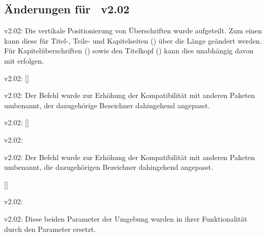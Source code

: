 %
\subsection{Änderungen für \TUDScript~v2.02}
\begin{Obsolete}{v2.02:}{}
\printobsoletelist%
%
Die vertikale Positionierung von Überschriften wurde aufgeteilt. Zum einen kann 
diese für Titel-, Teile- und Kapitelseiten () über 
die Länge  geändert werden. Für Kapitelüberschriften 
() sowie den Titelkopf () 
kann dies unabhängig davon mit  erfolgen.
\end{Obsolete}

\begin{Obsolete}{v2.02:}{%
  []%
}
\begin{Obsolete}{v2.02:}{}
\printobsoletelist%
%
Der Befehl wurde zur Erhöhung der Kompatibilität mit anderen Paketen umbenannt, 
der dazugehörige Bezeichner dahingehend angepasst.
\end{Obsolete}
\end{Obsolete}

\begin{Obsolete}{v2.02:}{%
  []%
}
\begin{Obsolete}{v2.02:}{}
\begin{Obsolete}{v2.02:}{}
\printobsoletelist%
%
Der Befehl wurde zur Erhöhung der Kompatibilität mit anderen Paketen umbenannt, 
die dazugehörigen Bezeichner dahingehend angepasst.
\end{Obsolete}
\end{Obsolete}
\end{Obsolete}

\begin{Obsolete}{}{[]}
\begin{Obsolete}{v2.02:}{%
}
\begin{Obsolete}{v2.02:}{%
}
\printobsoletelist%
%
Diese beiden Parameter der Umgebung  wurden in ihrer 
Funktionalität durch den Parameter  
ersetzt.
\end{Obsolete}
\end{Obsolete}
\end{Obsolete}



